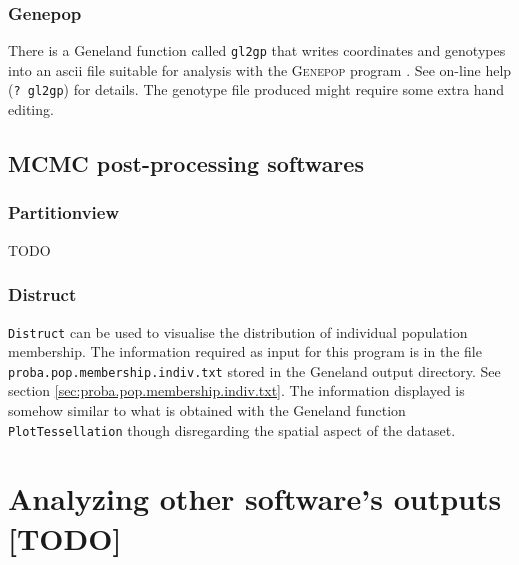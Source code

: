 \documentclass[a4paper,10pt]{article}
\begin{document}
\subsubsection{Genepop}
There is a {\sc Geneland} function called \texttt{gl2gp} that writes coordinates and genotypes into an ascii file suitable for analysis 
with the \textsc{Genepop} program \citep{Rousset07}. See on-line help (\texttt{? gl2gp}) for details. 
The genotype file produced might require some extra hand editing.

\subsection{MCMC post-processing  softwares}
\subsubsection{Partitionview}

TODO

\subsubsection{Distruct}
\texttt{Distruct} can be used to visualise the distribution of individual population membership. 
The information required as input for this program is in the file \texttt{proba.pop.membership.indiv.txt} stored in the {\sc Geneland} output directory. 
See section \ref{sec:proba.pop.membership.indiv.txt}. 
The information displayed is somehow similar to what is obtained with the {\sc Geneland} function \texttt{PlotTessellation} 
though disregarding the spatial aspect of the dataset. 




\section{Analyzing other software's outputs [TODO]}
\end{document}
